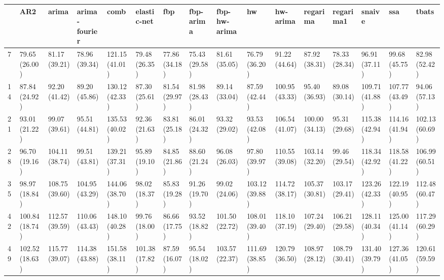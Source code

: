 \begin{tabular}{llllllllllllllll}
\toprule
{} &             AR2 &           arima &    arima-fourier &            comb &     elastic-net &             fbp &       fbp-arima &    fbp-hw-arima &              hw &        hw-arima &        regarima &       regarima1 &          snaive &             ssa &           tbats \\
\midrule
7   &   79.65 (26.00) &   81.17 (39.21) &    78.96 (39.34) &  121.15 (41.01) &   79.48 (26.35) &   77.86 (34.18) &   75.43 (29.58) &   81.61 (35.05) &   76.79 (36.20) &   91.22 (44.64) &   87.92 (38.31) &   78.33 (28.34) &   96.91 (37.11) &   99.68 (45.75) &   82.98 (52.42) \\
14  &   87.84 (24.92) &   92.20 (41.42) &    89.20 (45.86) &  130.12 (42.33) &   87.30 (25.61) &   81.54 (29.97) &   81.98 (28.43) &   89.14 (33.04) &   87.59 (42.44) &  100.95 (43.33) &   95.40 (36.93) &   89.08 (30.14) &  109.71 (41.88) &  107.77 (43.49) &   94.06 (57.13) \\
21  &   93.01 (21.22) &   99.07 (39.61) &    95.51 (44.81) &  135.53 (40.02) &   92.36 (21.63) &   83.81 (25.18) &   86.01 (24.32) &   93.32 (29.02) &   93.53 (42.08) &  106.54 (41.07) &  100.00 (34.13) &   95.31 (29.68) &  115.38 (42.94) &  114.16 (41.94) &  102.13 (60.69) \\
28  &   96.70 (19.16) &  104.11 (38.74) &    99.51 (43.81) &  139.21 (37.31) &   95.89 (19.10) &   84.85 (21.86) &   88.60 (21.24) &   96.08 (26.03) &   97.80 (39.97) &  110.55 (39.08) &  103.14 (32.20) &   99.46 (29.54) &  118.34 (42.92) &  118.58 (41.22) &  106.99 (60.51) \\
35  &   98.97 (18.84) &  108.75 (39.60) &   104.95 (43.29) &  144.06 (38.70) &   98.02 (18.37) &   85.83 (19.28) &   91.26 (19.70) &   99.02 (24.06) &  103.12 (39.88) &  114.72 (38.17) &  105.37 (30.81) &  103.17 (29.41) &  123.26 (42.33) &  122.19 (40.95) &  112.48 (60.47) \\
42  &  100.84 (18.74) &  112.57 (39.59) &   110.06 (43.43) &  148.10 (40.28) &   99.76 (18.00) &   86.66 (17.75) &   93.52 (18.82) &  101.50 (22.72) &  108.01 (39.40) &  118.10 (37.19) &  107.24 (29.40) &  106.21 (29.58) &  128.11 (40.34) &  125.00 (41.14) &  117.29 (60.29) \\
49  &  102.52 (18.63) &  115.77 (39.07) &   114.38 (43.88) &  151.58 (38.11) &  101.38 (17.82) &   87.59 (16.07) &   95.54 (18.02) &  103.57 (22.37) &  111.69 (38.85) &  120.79 (36.50) &  108.97 (28.12) &  108.79 (30.41) &  131.40 (39.79) &  127.36 (41.05) &  120.61 (59.59) \\

\end{tabular}
